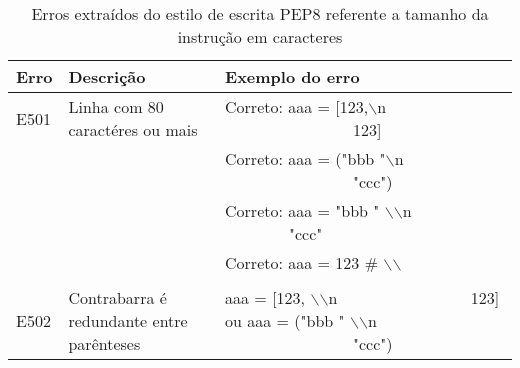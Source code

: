 	\begin{table}
		\scriptsize
		\begin{tabularx}{\linewidth}{ |l|X|X| }
			\hline
			\textbf{Erro}
			& \textbf{Descrição}
			& \textbf{Exemplo do erro} \\
			\hline
			E501 
			& Linha com 80 caractéres ou mais 
			& Correto: aaa = [123,$\backslash$n \ \ \ \ \ \ \ \  \ \ \ \ \ \ \ \ 123] \\
			\hline
			& 
			& Correto: aaa = ("bbb "$\backslash$n \ \ \ \ \ \ \ \  \ \ \ \ \ \ \ \ "ccc") \\
			\hline
			& 
			& Correto: aaa = "bbb " $\backslash$$\backslash$n \ \ \ \ \ \ \ \ "ccc" \\
			\hline
			& 
			& Correto: aaa = 123  \# $\backslash$$\backslash$ \\
			\hline
			& 
			&  \\
			\hline
			E502 
			& Contrabarra é redundante entre parênteses 
			& aaa = [123, $\backslash$$\backslash$n \ \ \ \ \ \ \ \  \ \ \ \ \ \ \ \ 123] ou aaa = ("bbb " $\backslash$$\backslash$n \ \ \ \ \ \ \ \  \ \ \ \ \ \ \ \ "ccc") \\
			\hline
		\end{tabularx}
		\caption{Erros extraídos do estilo de escrita PEP8 referente a tamanho da instrução em caracteres}
		\label{tab:pep8E500}
	\end{table}

